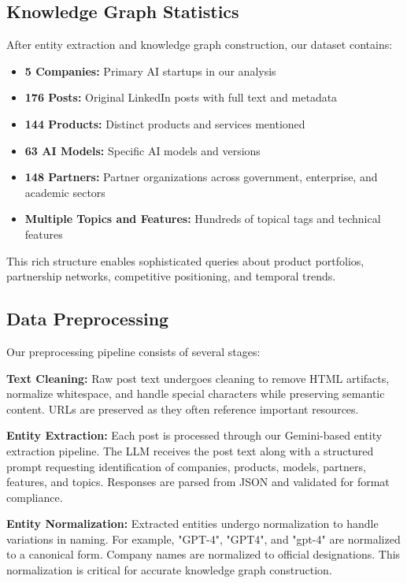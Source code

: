 \documentclass[11pt,twocolumn]{article}
\begin{document}
\subsection{Knowledge Graph Statistics}

After entity extraction and knowledge graph construction, our dataset contains:

\begin{itemize}
\item \textbf{5 Companies:} Primary AI startups in our analysis
\item \textbf{176 Posts:} Original LinkedIn posts with full text and metadata
\item \textbf{144 Products:} Distinct products and services mentioned
\item \textbf{63 AI Models:} Specific AI models and versions
\item \textbf{148 Partners:} Partner organizations across government, enterprise, and academic sectors
\item \textbf{Multiple Topics and Features:} Hundreds of topical tags and technical features
\end{itemize}

This rich structure enables sophisticated queries about product portfolios, partnership networks, competitive positioning, and temporal trends.

\subsection{Data Preprocessing}

Our preprocessing pipeline consists of several stages:

\textbf{Text Cleaning:} Raw post text undergoes cleaning to remove HTML artifacts, normalize whitespace, and handle special characters while preserving semantic content. URLs are preserved as they often reference important resources.

\textbf{Entity Extraction:} Each post is processed through our Gemini-based entity extraction pipeline. The LLM receives the post text along with a structured prompt requesting identification of companies, products, models, partners, features, and topics. Responses are parsed from JSON and validated for format compliance.

\textbf{Entity Normalization:} Extracted entities undergo normalization to handle variations in naming. For example, "GPT-4", "GPT4", and "gpt-4" are normalized to a canonical form. Company names are normalized to official designations. This normalization is critical for accurate knowledge graph construction.
\end{document}
